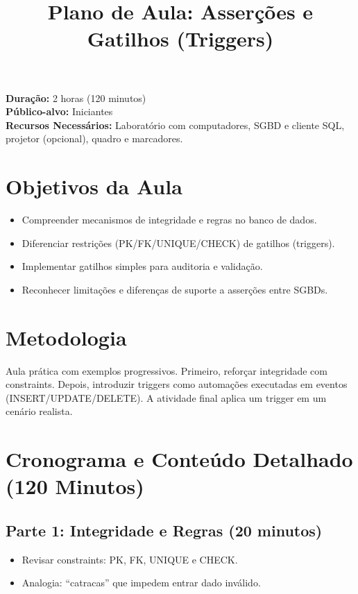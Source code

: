\documentclass[12pt,a4paper]{article}
\title{Plano de Aula: Asserções e Gatilhos (Triggers)}
\date{}
\begin{document}
\maketitle

\noindent
\textbf{Duração:} 2 horas (120 minutos)\\
\textbf{Público-alvo:} Iniciantes\\
\textbf{Recursos Necessários:} Laboratório com computadores, SGBD e cliente SQL, projetor (opcional), quadro e marcadores.

\section{Objetivos da Aula}
\begin{itemize}[leftmargin=*,itemsep=0.25em]
  \item Compreender mecanismos de integridade e regras no banco de dados.
  \item Diferenciar restrições (PK/FK/UNIQUE/CHECK) de gatilhos (triggers).
  \item Implementar gatilhos simples para auditoria e validação.
  \item Reconhecer limitações e diferenças de suporte a asserções entre SGBDs.
\end{itemize}

\section{Metodologia}
Aula prática com exemplos progressivos. Primeiro, reforçar integridade com constraints. Depois, introduzir triggers como automações executadas em eventos (INSERT/UPDATE/DELETE). A atividade final aplica um trigger em um cenário realista.

\section{Cronograma e Conteúdo Detalhado (120 Minutos)}
\subsection*{Parte 1: Integridade e Regras (20 minutos)}
\begin{itemize}[leftmargin=*,itemsep=0.35em]
  \item Revisar constraints: PK, FK, UNIQUE e CHECK.
  \item Analogia: ``catracas'' que impedem entrar dado inválido.
\end{itemize}
\end{document}
